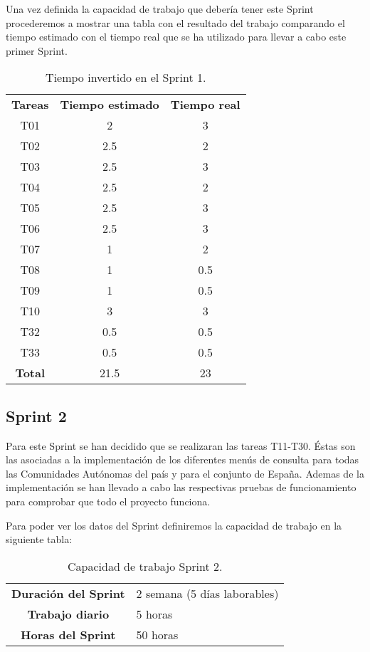 Una vez definida la capacidad de trabajo que debería tener este Sprint procederemos a mostrar una tabla con el resultado del trabajo comparando el tiempo estimado con el tiempo real que se ha utilizado para llevar a cabo este primer Sprint.

\begin{table}[H]
	\begin{center}
		\begin{tabular}{| c | c | c |}
			\hline

			\textbf{Tareas} & \textbf{Tiempo estimado} & \textbf{Tiempo real} \\
			T01 & 2 & 3 \\
			T02 & 2.5 & 2 \\
			T03 & 2.5 & 3 \\
			T04 & 2.5 & 2 \\
			T05 & 2.5 & 3 \\
			T06 & 2.5 & 3 \\
			T07 & 1 & 2 \\
			T08 & 1 & 0.5 \\
			T09 & 1 & 0.5 \\
			T10 & 3 & 3 \\
			T32 & 0.5 & 0.5 \\
			T33 & 0.5 & 0.5 \\
			\textbf{Total} & 21.5 & 23 \\ \hline
		\end{tabular}
		\caption{Tiempo invertido en el Sprint 1.}
	\end{center}
\end{table}

\subsection{Sprint 2}

Para este Sprint se han decidido que se realizaran las tareas T11-T30. Éstas son las asociadas a la implementación de los diferentes menús de consulta para todas las Comunidades Autónomas del país y para el conjunto de España. Ademas de la implementación se han llevado a cabo las respectivas pruebas de funcionamiento para comprobar que todo el proyecto funciona.

Para poder ver los datos del Sprint definiremos la capacidad de trabajo en la siguiente tabla:

\begin{table}[H]
	\begin{center}
		\begin{tabular}{| c | p{9cm} |}
			\hline

			\textbf{Duración del Sprint} & 2 semana (5 días laborables) \\
			\textbf{Trabajo diario} & 5 horas \\
			\textbf{Horas del Sprint} & 50 horas \\ \hline
		\end{tabular}
		\caption{Capacidad de trabajo Sprint 2.}
	\end{center}
\end{table}

